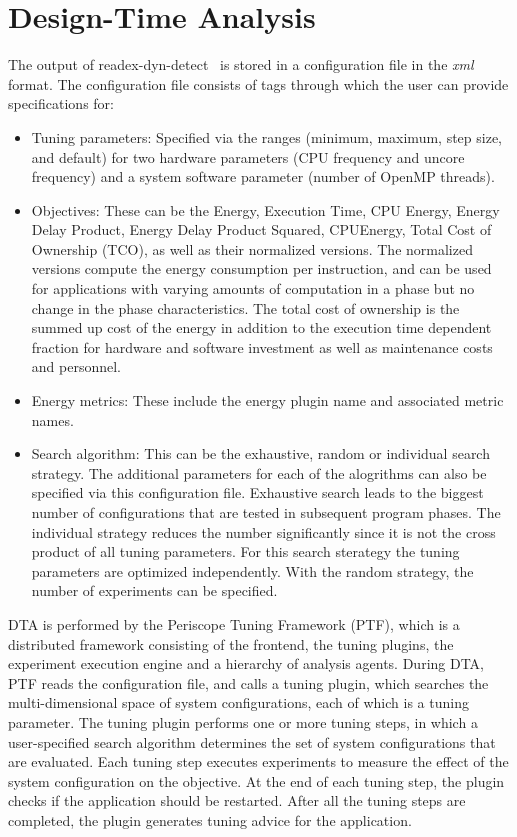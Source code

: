 \section{Design-Time Analysis} \label{sec:dta}
The output of readex-dyn-detect~\cite{kumaraswamy2018design} is stored in a configuration file in the \textit{xml} format. The configuration file consists of tags through which the user can provide specifications for:
\begin{itemize}
	\item Tuning parameters: Specified via the ranges (minimum, maximum, step size, and default) for two hardware parameters (CPU frequency and uncore frequency) and a system software parameter (number of OpenMP threads).
	\item Objectives: These can be the Energy, Execution Time, CPU Energy, Energy Delay Product, Energy Delay Product Squared, CPUEnergy, Total Cost of Ownership (TCO), as well as their normalized versions. The normalized versions compute the energy consumption per instruction, and can be used for applications with varying amounts of computation in a phase but no change in the phase characteristics. The total cost of ownership is the summed up cost of the energy in addition to the execution time dependent fraction for hardware and software investment as well as maintenance costs and personnel. 
	\item Energy metrics: These include the energy plugin name and associated metric names. 
	\item Search algorithm: This can be the exhaustive, random or individual search strategy. The additional parameters for each of the alogrithms can also be specified via this configuration file. Exhaustive search leads to the biggest number of configurations that are tested in subsequent program phases. The individual strategy reduces the number significantly since it is not the cross product of all tuning parameters. For this search sterategy the tuning parameters are optimized independently. With the random strategy, the number of experiments can be specified.
\end{itemize} 

DTA is performed by the Periscope Tuning Framework (PTF), which is a distributed framework consisting of the frontend, the tuning plugins, the experiment execution engine and a hierarchy of analysis agents. During DTA, PTF reads the configuration file, and calls a tuning plugin, which  searches the multi-dimensional space of system configurations, each of which is a tuning parameter. The tuning plugin performs one or more tuning steps, in which a user-specified search algorithm determines the set of system configurations that are evaluated. Each tuning step executes experiments to measure the effect of the system configuration on the objective. At the end of each tuning step, the plugin checks if the application should be restarted. After all the tuning steps are completed, the plugin generates tuning advice for the application.

